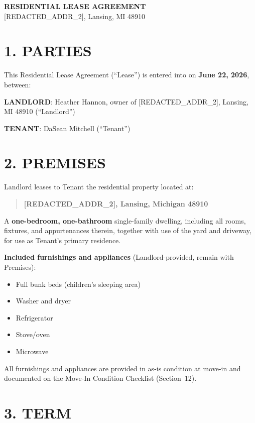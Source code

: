 \documentclass[11pt]{article}
\begin{document}
\begin{center}
{\LARGE \textbf{RESIDENTIAL LEASE AGREEMENT}}\\[0.5em]
{\large [REDACTED_ADDR_2], Lansing, MI 48910}
\end{center}

\bigskip

\section{1. PARTIES}

This Residential Lease Agreement (``Lease'') is entered into on
\textbf{June 22, 2026}, between:

\textbf{LANDLORD}: Heather Hannon, owner of [REDACTED_ADDR_2], Lansing,
MI 48910 (``Landlord'')

\textbf{TENANT}: DaSean Mitchell (``Tenant'')

\section{2. PREMISES}

Landlord leases to Tenant the residential property located at:

\begin{quote}
\textbf{[REDACTED_ADDR_2], Lansing, Michigan 48910}
\end{quote}

A \textbf{one-bedroom, one-bathroom} single-family dwelling, including
all rooms, fixtures, and appurtenances therein, together with use of
the yard and driveway, for use as Tenant's primary residence.

\textbf{Included furnishings and appliances} (Landlord-provided, remain
with Premises):

\begin{itemize}[nosep]
\item Full bunk beds (children's sleeping area)
\item Washer and dryer
\item Refrigerator
\item Stove/oven
\item Microwave
\end{itemize}

All furnishings and appliances are provided in as-is condition at
move-in and documented on the Move-In Condition Checklist (Section~12).

\section{3. TERM}
\end{document}
